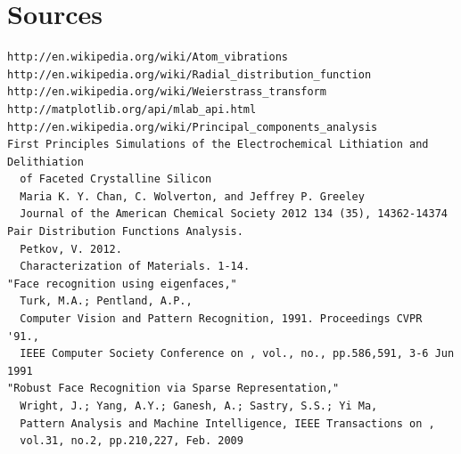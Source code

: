 \documentclass[12pt,letterpaper]{article}
\begin{document}
\section{Sources}
\begin{verbatim}
http://en.wikipedia.org/wiki/Atom_vibrations
http://en.wikipedia.org/wiki/Radial_distribution_function
http://en.wikipedia.org/wiki/Weierstrass_transform
http://matplotlib.org/api/mlab_api.html
http://en.wikipedia.org/wiki/Principal_components_analysis
First Principles Simulations of the Electrochemical Lithiation and Delithiation 
  of Faceted Crystalline Silicon
  Maria K. Y. Chan, C. Wolverton, and Jeffrey P. Greeley
  Journal of the American Chemical Society 2012 134 (35), 14362-14374
Pair Distribution Functions Analysis.
  Petkov, V. 2012. 
  Characterization of Materials. 1-14.
"Face recognition using eigenfaces,"
  Turk, M.A.; Pentland, A.P., 
  Computer Vision and Pattern Recognition, 1991. Proceedings CVPR '91., 
  IEEE Computer Society Conference on , vol., no., pp.586,591, 3-6 Jun 1991
"Robust Face Recognition via Sparse Representation," 
  Wright, J.; Yang, A.Y.; Ganesh, A.; Sastry, S.S.; Yi Ma, 
  Pattern Analysis and Machine Intelligence, IEEE Transactions on , 
  vol.31, no.2, pp.210,227, Feb. 2009
\end{verbatim}
\end{document}
